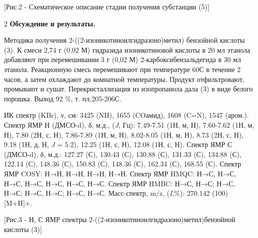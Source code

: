 [Рис.2 - Схематическое описание стадии получения субстанции (5)]

\begin{multicols}{2}
{\bfseries Обсуждение и результаты.}

Методика получения 2-((2-изоникотиноилгид\-разоно)метил) бензойной кислоты
(3). К смеси 2,74 г (0,02 М) гидразида изоникотиновой кислоты в 20 мл
этанола добавляют при перемешивании 3 г (0,02 М) 2-карбоксибензальдегида
в 30 мл этанола. Реакционную смесь перемешивают при температуре
60С в течение 2 часов, а затем охлаждают до комнатной
температуры. Продукт отфильтровают, промывают и сушат.
Перекристаллизация из изопропанола дала (3) в виде белого порошка. Выход
92 \%, т. пл.205-206С.

ИК спектр (KBr), ν, см: 3425 (NH), 1655 (COамид),
1608 (C=N), 1547 (аром.). Спектр ЯМР Н
(ДМСО-d), δ, м.д., (\emph{J}, Гц): 7.49-7.51 (1Н, м,
Н), 7.60-7.62 (1Н, м, Н), 7.80
(2Н, с, Н), 7.86-7.89 (1Н, м,
Н), 8.02-8.05 (1Н, м, Н), 8.73
(2Н, с, Н), 9.18 (1Н, д, Н,
\emph{J} = 5.2), 12.25 (1Н, с, Н),
12.08 (1Н, с, Н). Спектр ЯМР С
(ДМСО-d), δ, м.д.: 127.27
(С), 130.43 (С), 130.88
(С), 131.33 (С), 134.88
(С), 122.14 (С), 148.36
(С), 150.83 (С), 148.36
(С), 162.34 (С), 168.55
(С). Спектр ЯМР COSY:
Н→Н,
Н→Н,
Н→Н,
Н→Н. Спектр ЯМР HMQC:
Н→С,
Н→С,
Н→С,
Н→С,
Н→С,
Н→С,
Н→С. Спектр ЯМР HMBC:
Н→С,
Н→С;
Н→С,
Н→С;
Н→С,
Н→С;
Н→С,
Н→С. Масс-спектр, m/z,
(\emph{I},\%): 270.142 (100) {[}M+H{]}+.
\end{multicols}

[Рис.3 - Н, С ЯМР
спектры 2-((2-изоникотиноилгидразоно)метил)бензойной кислоты (3)]

